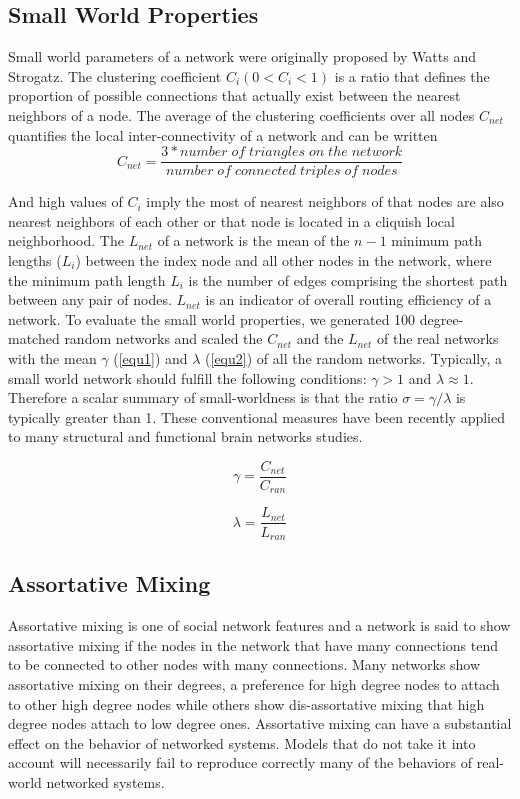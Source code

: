 \documentclass{llncs}
\begin{document}
\subsection{Small World Properties}
Small world parameters of a network were originally proposed by Watts and Strogatz. The clustering coefficient $C_i (0 < C_i < 1)$ is a ratio that defines the proportion of possible connections that actually exist between the nearest neighbors of a node\cite{18}. The average of the clustering coefficients over all nodes $C_{net}$ quantifies the local inter-connectivity of a network and can be written
\begin{equation}
C_{net} = \frac{3 * number\;of\;triangles\; on\; the\; network}{number\; of\; connected\; triples\; of\; nodes}
\end{equation}

And high values of $C_i$ imply the most of nearest neighbors of that nodes are also nearest neighbors of each other or that node is located in a cliquish local neighborhood. The $L_{net}$ of a network is the mean of the $n-1$ minimum path lengths ($L_i$) between the index node and all other nodes in the network, where the minimum path length $L_i$ is the number of edges comprising the shortest path between any pair of nodes. $L_{net}$ is an indicator of overall routing efficiency of a network\cite{19}. To evaluate the small world properties, we generated 100 degree-matched random networks and scaled the $C_{net}$ and the $L_{net}$ of the real networks with the mean $\gamma$ (\ref{equ1}) and $\lambda$ (\ref{equ2}) of all the random networks\cite{20,21}. Typically, a small world network should fulfill the following conditions: $\gamma > 1$ and $\lambda \approx 1$\cite{17}. Therefore a scalar summary of small-worldness is that the ratio $\sigma = \gamma / \lambda$ is typically greater than 1\cite{22}. These conventional measures have been recently applied to many structural and functional brain networks studies\cite{5,6,23}.

\begin{equation}
\label{equ1}
\gamma = \frac{C_{net}}{C_{ran}}
\end{equation}

\begin{equation}
\label{equ2}
\lambda = \frac{L_{net}}{L_{ran}}
\end{equation}

\subsection{Assortative Mixing}
Assortative mixing is one of social network features and a network is said to show assortative mixing if the nodes in the network that have many connections tend to be connected to other nodes with many connections. Many networks show assortative mixing on their degrees, a preference for high degree nodes to attach to other high degree nodes while others show dis-assortative mixing that high degree nodes attach to low degree ones\cite{24}. Assortative mixing can have a substantial effect on the behavior of networked systems. Models that do not take it into account will necessarily fail to reproduce correctly many of the behaviors of real-world networked systems.
\end{document}
